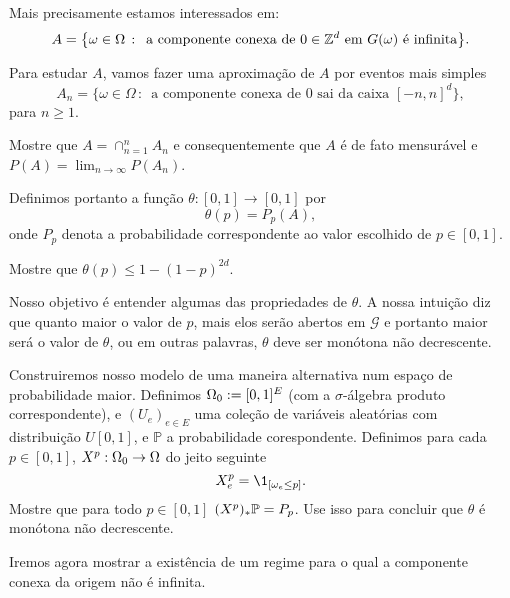 \begin{topics}
Mais precisamente estamos interessados em:
\begin{equation}
  A = \big\{\omega \in \Omega \, : \,  \text{ a componente conexa de $0 \in \mathbb{Z}^d$ em $G(\omega)$ é infinita} \big\}.
\end{equation}

Para estudar $A$, vamos fazer uma aproximação de $A$ por eventos mais simples
\begin{equation}
  A_n = \big\{ \omega \in \Omega \, : \, \text{ a componente conexa de $0$ sai da caixa $[-n, n]^d$}\},
\end{equation}
para $n \geq 1$.

\begin{exercise}
  Mostre que $A = \cap_{n=1}^n A_n$ e consequentemente que $A$ é de fato mensurável e $P(A) = \lim_{n\to \infty} P(A_n)$.
\end{exercise}

Definimos portanto a função $\theta:[0,1] \to [0,1]$ por
\begin{equation}
  \theta(p) = P_p(A),
\end{equation}
onde $P_p$ denota a probabilidade correspondente ao valor escolhido de $p \in [0,1]$.

\begin{exercise}
  Mostre que $\theta(p) \leq 1-(1-p)^{2d}$.
\end{exercise}

Nosso objetivo é entender algumas das propriedades de $\theta$.
A nossa intuição diz que quanto maior o valor de $p$, mais elos serão abertos em $\mathcal{G}$ e portanto maior será o valor de $\theta$, ou em outras palavras, $\theta$ deve ser monótona não decrescente.

\begin{exercise}
  Construiremos nosso modelo de uma maneira alternativa num espaço de probabilidade maior.
  Definimos $\Omega_0:=[0,1]^E$ (com a $\sigma$-álgebra produto correspondente), e $(U_e)_{e\in E}$
  uma coleção de variáveis aleatórias \iid com distribuição $U[0,1]$, e  $\mathbb{P}$ a probabilidade corespondente.
  Definimos para cada $p \in [0,1]$, $X^p : \Omega_0 \to \Omega$ do jeito seguinte
  \begin{equation}
    X^p_e = \1_{[\go_e \leq p]}.
  \end{equation}
  Mostre que para todo $p \in [0,1]$  $(X^p)_*{\mathbb P}=P_p$.
  Use isso para concluir que $\theta$ é monótona não decrescente.
\end{exercise}

Iremos agora mostrar a existência de um regime para o qual a componente conexa da origem não é infinita.


\end{topics}
